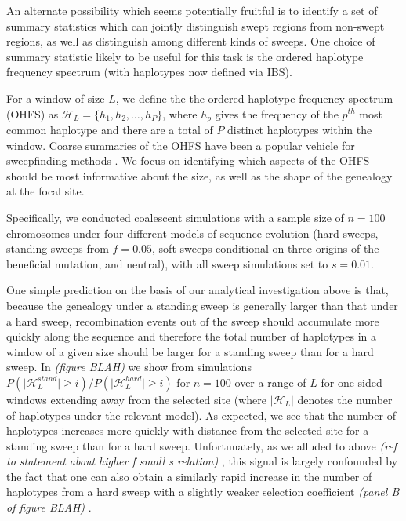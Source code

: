 \documentclass[a4paper,10pt]{article}
\newcommand{\jb}[1]{{\it\color{blue} (#1)} }
\begin{document}
An alternate possibility which seems potentially fruitful is to identify a set of summary statistics which can jointly distinguish swept regions from non-swept regions, as well as distinguish among different kinds of sweeps. One choice of summary statistic likely to be useful for this task is the ordered haplotype frequency spectrum (with haplotypes now defined via IBS).

For a window of size $L$, we define the the ordered haplotype frequency spectrum (OHFS) as $\mathcal{H}_L = \{h_1,h_2,\dots,h_{P}\}$, where $h_p$ gives the frequency of the $p^{th}$ most common haplotype and there are a total of $P$ distinct haplotypes within the window. Coarse summaries of the OHFS have been a popular vehicle for sweepfinding methods \cite[e.g. EHH, iHS and H12:][]{Sabeti:2002ge,Voight:2006go,Garud:2015jy}. We focus on identifying which aspects of the OHFS should be most informative about the size, as well as the shape of the genealogy at the focal site.

Specifically, we conducted coalescent simulations with a sample size of $n=100$ chromosomes under four different models of sequence evolution (hard sweeps, standing sweeps from $f=0.05$, soft sweeps conditional on three origins of the beneficial mutation, and neutral), with all sweep simulations set to $s=0.01$. 

One simple prediction on the basis of our analytical investigation above is that, because the genealogy under a standing sweep is generally larger than that under a hard sweep, recombination events out of the sweep should accumulate more quickly along the sequence and therefore the total number of haplotypes in a window of a given size should be larger for a standing sweep than for a hard sweep. In \jb{figure BLAH} we show from simulations $P\left(\lvert \mathcal{H}_L^{stand} \rvert \geq i \right)/P\left(\lvert \mathcal{H}_L^{hard} \rvert \geq i \right)$ for $n = 100$ over a range of $L$ for one sided windows extending away from the selected site (where $\lvert \mathcal{H}_L \rvert$ denotes the number of haplotypes under the relevant model). As expected, we see that the number of haplotypes increases more quickly with distance from the selected site for a standing sweep than for a hard sweep. Unfortunately, as we alluded to above \jb{ref to statement about higher f small s relation}, this signal is largely confounded by the fact that one can also obtain a similarly rapid increase in the number of haplotypes from a hard sweep with a slightly weaker selection coefficient \jb{panel B of figure BLAH}.
\end{document}
